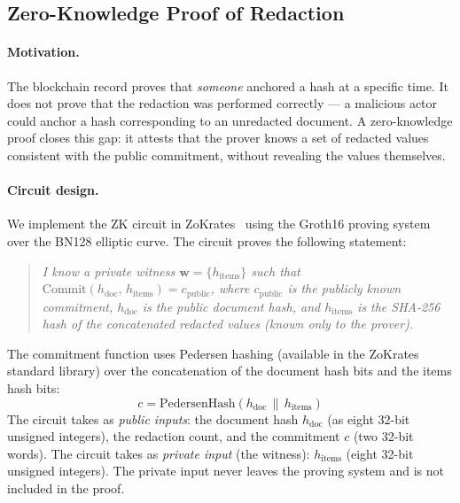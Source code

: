 \subsection{Zero-Knowledge Proof of Redaction}

\paragraph{Motivation.}
The blockchain record proves that \emph{someone}
anchored a hash at a specific time.
It does not prove that the redaction was performed
correctly --- a malicious actor could anchor a hash
corresponding to an unredacted document.
A zero-knowledge proof closes this gap: it attests
that the prover knows a set of redacted values
consistent with the public commitment, without
revealing the values themselves.

\paragraph{Circuit design.}
We implement the ZK circuit in ZoKrates~\cite{eberhardt2018zokrates}
using the Groth16 proving system over the
BN128 elliptic curve.
The circuit proves the following statement:

\begin{quote}
\textit{I know a private witness
$\mathbf{w} = \{h_{\text{items}}\}$ such that
$\text{Commit}(h_{\text{doc}},\, h_{\text{items}}) =
c_{\text{public}}$, where $c_{\text{public}}$ is the
publicly known commitment, $h_{\text{doc}}$ is the
public document hash, and $h_{\text{items}}$ is the
SHA-256 hash of the concatenated redacted values
(known only to the prover).}
\end{quote}

The commitment function uses Pedersen hashing
(available in the ZoKrates standard library) over
the concatenation of the document hash bits and
the items hash bits:
\begin{equation}
  c = \text{PedersenHash}(
        h_{\text{doc}} \,\|\, h_{\text{items}})
  \label{eq:commitment}
\end{equation}
The circuit takes as \emph{public inputs}:
the document hash $h_{\text{doc}}$ (as eight
32-bit unsigned integers), the redaction count,
and the commitment $c$ (two 32-bit words).
The circuit takes as \emph{private input}
(the witness): $h_{\text{items}}$ (eight 32-bit
unsigned integers).
The private input never leaves the proving system
and is not included in the proof.

